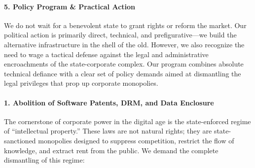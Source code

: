 \paragraph{5. Policy Program \& Practical
Action}\label{policy-program-practical-action-13}

We do not wait for a benevolent state to grant rights or reform the
market. Our political action is primarily direct, technical, and
prefigurative---we build the alternative infrastructure in the shell of
the old. However, we also recognize the need to wage a tactical defense
against the legal and administrative encroachments of the
state-corporate complex. Our program combines absolute technical
defiance with a clear set of policy demands aimed at dismantling the
legal privileges that prop up corporate monopolies.

\paragraph{1. Abolition of Software Patents, DRM, and Data
Enclosure}\label{abolition-of-software-patents-drm-and-data-enclosure}

The cornerstone of corporate power in the digital age is the
state-enforced regime of ``intellectual property.'' These laws are not
natural rights; they are state-sanctioned monopolies designed to
suppress competition, restrict the flow of knowledge, and extract rent
from the public. We demand the complete dismantling of this regime:

